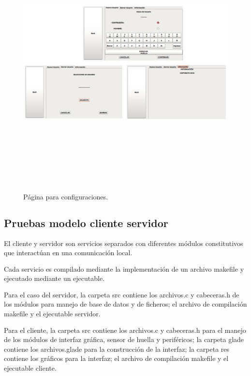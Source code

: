 \begin{figure}[h]
	\centering
	\includegraphics[height=14cm,width=12cm]{./Figures/pagconfiguracion.png}
	\caption{Página para configuraciones.}
	\label{fig:pagconfiguracion}
\end{figure}

\subsection{Pruebas modelo cliente servidor}
El cliente y servidor son servicios separados con diferentes módulos constitutivos que interactúan en una comunicación local.

Cada servicio es compilado mediante la implementación de un archivo makefile y ejecutado mediante un ejecutable.

Para el caso del servidor, la carpeta src contiene los archivos.c y cabeceras.h de los módulos para manejo de base de datos y de ficheros; el archivo de compilación makefile y el ejecutable servidor.

Para el cliente, la carpeta src contiene los archivos.c y cabeceras.h para el manejo de los módulos de interfaz gráfica, sensor de huella y periféricos; la carpeta glade contiene los archivos.glade para la construcción de la interfaz; la carpeta res contiene los gráficos para la interfaz; el archivo de compilación makefile y el ejecutable cliente.

